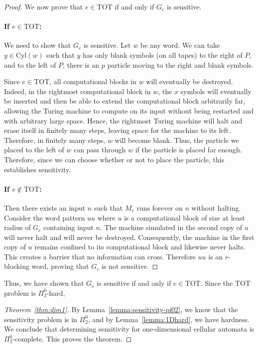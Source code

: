 \documentclass{llncs}
\begin{document}
\begin{proof}
We now prove that $e \in \text{TOT}$ if and only if $G_e$ is sensitive.


\paragraph{If $e \in \text{TOT}$:} We need to show that $G_e$ is sensitive. Let $w$ be any word. We can take $y \in \text{Cyl}(w)$ such that $y$ has only blank symbols (on all tapes) to the right of $P$, and to the left of $P$, there is an $p$ particle moving to the right and blank symbols.

Since $e \in \text{TOT}$, all computational blocks in $w$ will eventually be destroyed. Indeed, in the rightmost computational block in $w$, the $x$ symbols will eventually be inserted and then be able to extend the computational block arbitrarily far, allowing the Turing machine to compute on its input without being restarted and with arbitrary large space. Hence, the rightmost Turing machine will halt and erase itself in finitely many steps, leaving space for the machine to its left. Therefore, in finitely many steps, $w$ will become blank. Thus, the particle we placed to the left of $w$ can pass through $w$ if the particle is placed far enough. Therefore, since we can choose whether or not to place the particle, this establishes sensitivity.

\paragraph{If $e \notin \text{TOT}$:} Then there exists an input $n$ such that $M_e$ runs forever on $n$ without halting. Consider the word pattern $uu$ where $u$ is a computational block of size at least radius of $G_e$ containing input $n$. The machine simulated in the second copy of $u$ will never halt and will never be destroyed. Consequently, the machine in the first copy of $u$ remains confined to its computational block and likewise never halts. This creates a barrier that no information can cross. Therefore $uu$ is an $r$-blocking word, proving that $G_e$ is not sensitive.


\end{proof}

Thus, we have shown that $G_e$ is sensitive if and only if $e \in \text{TOT}$. Since the TOT problem is $\Pi^0_2$-hard,

\begin{proof}[Theorem~\ref{thm:dim1}]
By Lemma~\ref{lemma:sensitivity-pi02}, we know that the sensitivity problem is in $\Pi^0_2$, and by Lemma~\ref{lemma:1Dhard}, we have hardness. We conclude that determining sensitivity for one-dimensional cellular automata is $\Pi^0_2$-complete. This proves the theorem.
\end{proof}
\end{document}
